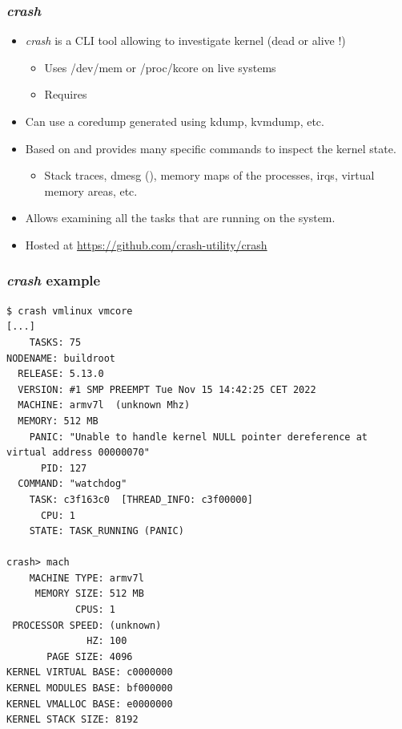 \begin{frame}
  \frametitle{{\em crash}}
  \begin{itemize}
    \item {\em crash} is a CLI tool allowing to investigate kernel (dead or
      alive !)
    \begin{itemize}
      \item Uses /dev/mem or /proc/kcore on live systems
      \item Requires 
    \end{itemize}
    \item Can use a coredump generated using kdump, kvmdump, etc.
    \item Based on  and provides many specific commands to inspect the
      kernel state.
    \begin{itemize}
      \item Stack traces, dmesg (), memory maps of the processes,
            irqs, virtual memory areas, etc.
    \end{itemize}
    \item Allows examining all the tasks that are running on the system.
    \item Hosted at \url{https://github.com/crash-utility/crash}
  \end{itemize}
\end{frame}

\begin{frame}[fragile]
  \frametitle{{\em crash} example}
  \begin{itemize}
    \begin{block}{}
      \begin{verbatim}
$ crash vmlinux vmcore
[...]
    TASKS: 75
NODENAME: buildroot
  RELEASE: 5.13.0
  VERSION: #1 SMP PREEMPT Tue Nov 15 14:42:25 CET 2022
  MACHINE: armv7l  (unknown Mhz)
  MEMORY: 512 MB
    PANIC: "Unable to handle kernel NULL pointer dereference at virtual address 00000070"
      PID: 127
  COMMAND: "watchdog"
    TASK: c3f163c0  [THREAD_INFO: c3f00000]
      CPU: 1
    STATE: TASK_RUNNING (PANIC)

crash> mach
    MACHINE TYPE: armv7l
     MEMORY SIZE: 512 MB
            CPUS: 1
 PROCESSOR SPEED: (unknown)
              HZ: 100
       PAGE SIZE: 4096
KERNEL VIRTUAL BASE: c0000000
KERNEL MODULES BASE: bf000000
KERNEL VMALLOC BASE: e0000000
KERNEL STACK SIZE: 8192
      \end{verbatim}
    \end{block}
  \end{itemize}
\end{frame}

